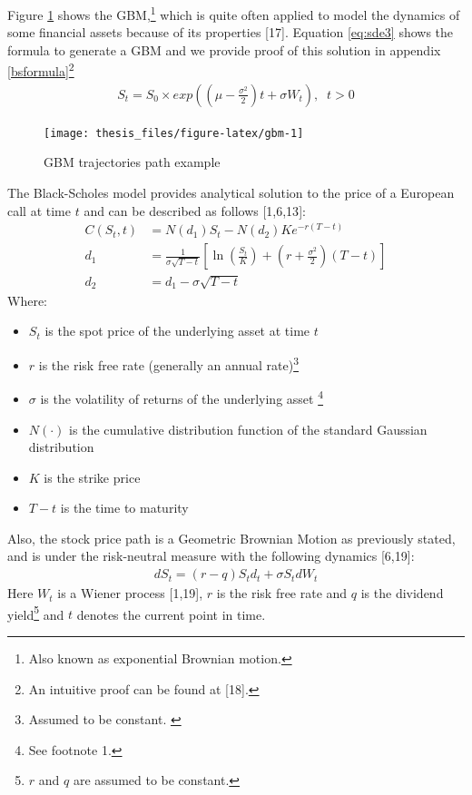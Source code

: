 \documentclass[12pt,twoside]{reedthesis}
\providecommand{\tightlist}{%
  \setlength{\itemsep}{0pt}\setlength{\parskip}{0pt}}
\theoremstyle{definition}
\theoremstyle{definition}
\theoremstyle{remark}
\begin{document}
  Figure \ref{fig:gbm} shows the GBM,\footnote{Also known as exponential
    Brownian motion.} which is quite often applied to model the dynamics
  of some financial assets because of its properties {[}17{]}. Equation
  \eqref{eq:sde3} shows the formula to generate a GBM and we provide proof
  of this solution in appendix \ref{bsformula}\footnote{An intuitive proof
    can be found at {[}18{]}.}
  \begin{align} \label{eq:sde3}
  S_t = S_0 \times exp{\left( \left( \mu - \frac{\sigma^2}{2} \right) t + \sigma W_t \right)}, \;\; t > 0
  \end{align}
  \begin{figure}
  
  {\centering \texttt{[image: thesis\_files/figure-latex/gbm-1]} 
  
  }
  
  \caption{GBM trajectories path example \label{gbm}}\label{fig:gbm}
  \end{figure}
  The Black-Scholes model provides analytical solution to the price of a
  European call at time \(t\) and can be described as follows
  {[}1,6,13{]}:
  \begin{align}
  C(S_{t},t)&=N(d_{1})S_{t}-N(d_{2})Ke^{-r(T-t)}\\[10pt]
  d_{1}&={\frac {1}{\sigma {\sqrt {T-t}}}}\left[\ln \left({\frac {S_{t}}{K}}\right)+\left(r+{\frac {\sigma ^{2}}{2}}\right)(T-t)\right]\\[10pt]
  d_{2}&=d_{1}-\sigma {\sqrt {T-t}}
  \end{align}
  \noindent
  Where:
  \begin{itemize}
  \tightlist
  \item
    \(S_{t}\) is the spot price of the underlying asset at time \(t\)
  \item
    \(r\) is the risk free rate (generally an annual
    rate)\footnote{Assumed to be constant. \label{teste}}
  \item
    \(\sigma\) is the volatility of returns of the underlying asset
    \footnote{See footnote 1.}
  \item
    \(N(\cdot )\) is the cumulative distribution function of the standard
    Gaussian distribution
  \item
    \(K\) is the strike price
  \item
    \(T-t\) is the time to maturity
  \end{itemize}
  \noindent
  Also, the stock price path is a Geometric Brownian Motion as previously
  stated, and is under the risk-neutral measure with the following
  dynamics {[}6,19{]}:
  \begin{align}
  dS_{t} = (r-q)S_td_t+\sigma S_t dW_t
  \end{align}
  \noindent
  Here \(W_t\) is a Wiener process {[}1,19{]}, \(r\) is the risk free rate
  and \(q\) is the dividend
  yield\footnote{$r$ and $q$ are assumed to be constant.} and \(t\)
  denotes the current point in time.
  
\end{document}
